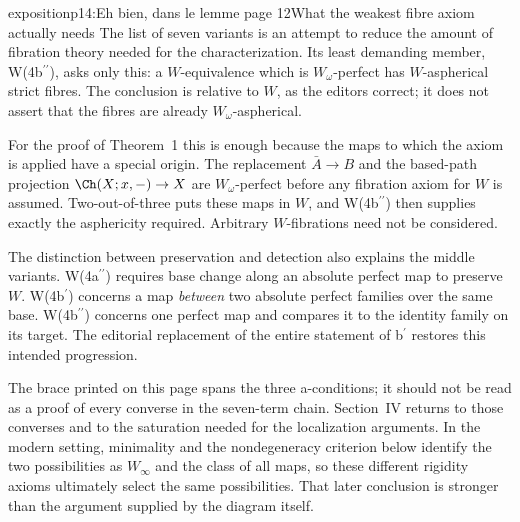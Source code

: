 \begin{dcomment}{exposition}{p14:Eh bien, dans le lemme page 12}{What the weakest fibre axiom actually needs}
The list of seven variants is an attempt to reduce the amount of fibration theory needed for the characterization. Its least demanding member, W(4b\(^{\prime\prime}\)), asks only this: a \(W\)-equivalence which is \(W_\omega\)-perfect has \(W\)-aspherical strict fibres. The conclusion is relative to \(W\), as the editors correct; it does not assert that the fibres are already \(W_\omega\)-aspherical.

For the proof of Theorem~1 this is enough because the maps to which the axiom is applied have a special origin. The replacement \(\bar A\to B\) and the based-path projection \(\Ch(X;x,-)\to X\) are \(W_\omega\)-perfect before any fibration axiom for \(W\) is assumed. Two-out-of-three puts these maps in \(W\), and W(4b\(^{\prime\prime}\)) then supplies exactly the asphericity required. Arbitrary \(W\)-fibrations need not be considered.

The distinction between preservation and detection also explains the middle variants. W(4a\(^{\prime\prime}\)) requires base change along an absolute perfect map to preserve \(W\). W(4b\(^{\prime}\)) concerns a map \emph{between} two absolute perfect families over the same base. W(4b\(^{\prime\prime}\)) concerns one perfect map and compares it to the identity family on its target. The editorial replacement of the entire statement of b\(^{\prime}\) restores this intended progression.

The brace printed on this page spans the three a-conditions; it should not be read as a proof of every converse in the seven-term chain. Section~IV returns to those converses and to the saturation needed for the localization arguments. In the modern setting, minimality and the nondegeneracy criterion below identify the two possibilities as \(W_\infty\) and the class of all maps, so these different rigidity axioms ultimately select the same possibilities. That later conclusion is stronger than the argument supplied by the diagram itself.
\end{dcomment}

